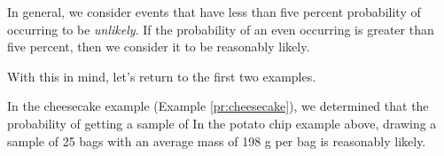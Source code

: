 \documentclass{ximera}
\begin{document}
In general, we consider events that have less than five percent probability of occurring to be \emph{unlikely}.  If the probability of an even occurring is greater than five percent, then we consider it to be reasonably likely.  

With this in mind, let's return to the first two examples.

In the cheesecake example (Example \ref{pr:cheesecake}), we determined that the probability of getting a sample of 
In the potato chip example above, drawing a sample of 25 bags with an average mass of 198 g per bag is reasonably likely.





\end{document}
